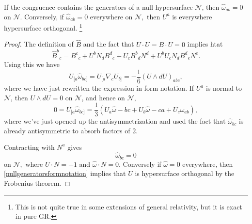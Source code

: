 \begin{prop}
    If the congruence contains the generators of a null hypersurface $\mathcal{N}$, then $\hat \omega_{ab}=0$ on $\mathcal{N}$. Conversely, if $\hat \omega_{ab}=0$ everywhere on $\mathcal{N},$ then $U^a$ is everywhere hypersurface orthogonal.%
        \footnote{This is not quite true in some extensions of general relativity, but it is exact in pure GR.}
\end{prop}
\begin{proof}
    The definition of $\hat B$ and the fact that $U\cdot U = B\cdot U=0$ implies htat
    \begin{equation}
        \hat B^b{}_c = B^c{}_c + U^b N_d B^d{}_c + U_c B^b{}_d N^d + U^b U_c N_d B^d{}_e N^e.
    \end{equation}
    Using this we have
    \begin{equation}\label{nullgeneratorsformnotation}
        U_{[a}\hat \omega_{bc]}=U_{[a}\nabla_c U_{b]} =-\frac{1}{6} (U\wedge dU)_{abc},
    \end{equation}
    where we have just rewritten the expression in form notation. If $U^a$ is normal to $\mathcal{N}$, then $U\wedge dU=0$ on $\mathcal{N}$, and hence on $\mathcal{N},$
    \begin{equation}
        0=U_{[a}\hat \omega_{bc]}=\frac{1}{3} (U_a \hat \omega-{bc}+U_b \hat \omega-{ca}+ U_c \hat \omega_{ab}),
    \end{equation}
    where we've just opened up the antisymmetrization and used the fact that $\hat \omega_{bc}$ is already antisymmetric to absorb factors of 2.
    
    Contracting with $N^a$ gives
    \begin{equation}
        \hat \omega_{bc}=0
    \end{equation}
    on $\mathcal{N},$ where $U\cdot N=-1$ and $\hat \omega \cdot N=0$. Conversely if $\hat \omega =0$ everywhere, then \ref{nullgeneratorsformnotation} implies that $U$ is hypersurface orthogonal by the Frobenius theorem.
\end{proof}